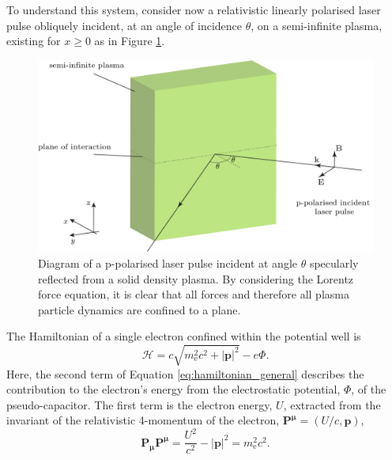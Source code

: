 To understand this system, consider now a relativistic linearly polarised laser pulse obliquely incident, at an angle of incidence $\theta$, on a semi-infinite plasma, existing for $x\ge0$ as in Figure \ref{fig:zvpforcesppol}.

\begin{figure}
	\centering
	\includegraphics[width=0.7\linewidth]{figures/zvp/zvp_forces_ppol}
	\caption[Diagram of a p-polarised laser pulse incident at angle $\theta$ specularly reflected from a solid density plasma.]{Diagram of a p-polarised laser pulse incident at angle $\theta$ specularly reflected from a solid density plasma. By considering the Lorentz force equation, it is clear that all forces and therefore all plasma particle dynamics are confined to a plane.}
	\label{fig:zvpforcesppol}
\end{figure}
The Hamiltonian of a single electron confined within the potential well \cite{goldsteinClassicalMechanics2013} is
\begin{equation}\label{eq:hamiltonian_general}
	\mathcal{H} = c\sqrt{m^2_\mathrm{e}c^2 + |\mathbf{p}|^2} - e\Phi.
\end{equation}
Here, the second term of Equation \ref{eq:hamiltonian_general} describes the contribution to the electron's energy from the electrostatic potential, $\Phi$, of the pseudo-capacitor. The first term is the electron energy, $U$, extracted from the invariant of the relativistic 4-momentum of the electron, $\mathbf{P^\mu} = (U/c, \mathbf{p})$,
\begin{equation}\label{eq:zvp-energy_invariant}
	\mathbf{P_\mu  P^\mu} = \frac{U^2}{c^2} - |\mathbf{p}|^2 = m^2_\mathrm{e}c^2.
\end{equation}

